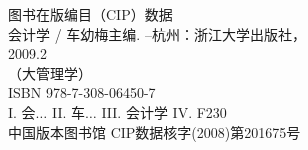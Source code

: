 \begingroup
\footnotesize
\parindent 0pt
\parskip \baselineskip
图书在版编目（CIP）数据 \\
会计学 / 车幼梅主编. --杭州：浙江大学出版社，\\
2009.2 \\
（大管理学） \\
ISBN 978-7-308-06450-7 \\
I. 会$\ldots$ II. 车$\ldots$ III. 会计学 IV. F230 \\
中国版本图书馆 CIP数据核字(2008)第201675号

\endgroup
